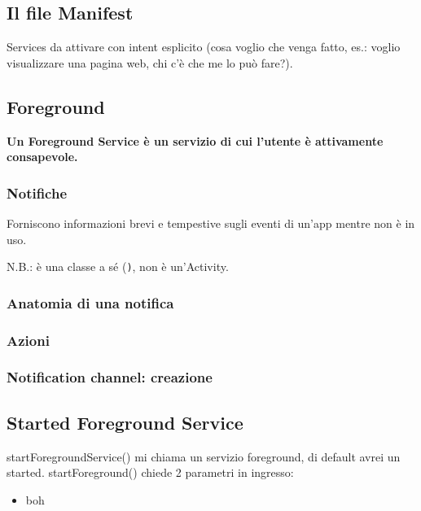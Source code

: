 \subsection{Il file Manifest}
\par Services da attivare con intent esplicito (cosa voglio che venga fatto, es.: voglio visualizzare una pagina web, chi c'è che me lo può fare?).

\subsection{Foreground}
\par \textbf{Un Foreground Service è un servizio di cui l'utente è attivamente consapevole.}

\subsubsection{Notifiche}
\par Forniscono informazioni brevi e tempestive sugli eventi di un'app mentre non è in uso.
\par N.B.: è una classe a sé (\texttt), non è un'Activity.

\subsubsection{Anatomia di una notifica}

\subsubsection{Azioni}

\subsubsection{Notification channel: creazione}

\subsection{Started Foreground Service}
startForegroundService() mi chiama un servizio foreground, di default avrei un started.
startForeground() chiede 2 parametri in ingresso:
\begin{itemize}
    \item boh
\end{itemize}


